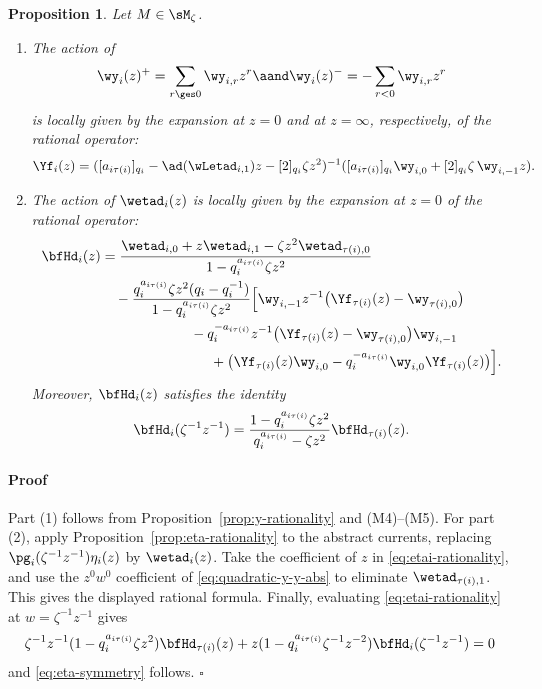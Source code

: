 \documentclass[reqno]{amsart}
\numberwithin{equation}{section}
\newtheorem*{proposition}{Proposition}
\newenvironment{pf}{\medskip\paragraph{{\sc Proof}}}{\hfill$\square$\par\medskip}
\begin{document}
\begin{proposition}
Let $M\in\sM_\zeta$.
\begin{enumerate}[leftmargin=2em]\itemsep0.25cm
\item The action of
\begin{equation}
	\wy_i(z)^+=\sum_{r\ges0}\wy_{i,r}z^r \aand \wy_i(z)^-=-\sum_{r<0}\wy_{i,r}z^r
\end{equation}
is locally given by the expansion at $z=0$ and at $z=\infty$, respectively, of the rational operator:
\begin{equation}
	\Yf_i(z)=([a_{i\tau(i)}]_{q_i}-\ad(\wLetad_{i,1})z-[2]_{q_i}\zeta z^2)^{-1}([a_{i\tau(i)}]_{q_i}\wy_{i,0}
	+[2]_{q_i}\zeta\, \wy_{i,-1}z).
\end{equation}
\item
The action of $\wetad_i(z)$ is locally given by the expansion at $z=0$ of the rational operator:
\begin{equation}
	\begin{aligned}
	\bfHd_i(z)
	&=
	\frac{\wetad_{i,0}+z\wetad_{i,1}-\zeta z^2\wetad_{\tau(i),0}}
	{1-q_i^{a_{i\tau(i)}}\zeta z^2}
	\\
	&\quad-
	\frac{q_i^{a_{i\tau(i)}}\zeta z^2(q_i-q_i^{-1})}
	{1-q_i^{a_{i\tau(i)}}\zeta z^2}
	\Big[
	\wy_{i,-1}
	z^{-1}\bigl(\Yf_{\tau(i)}(z)-\wy_{\tau(i),0}\bigr)
	\\
	&\hspace{2.25cm}
	-
	q_i^{-a_{i\tau(i)}}z^{-1}\bigl(\Yf_{\tau(i)}(z)-\wy_{\tau(i),0}\bigr)\wy_{i,-1}
	\\
	&\hspace{2.75cm}
	+
	\bigl(
	\Yf_{\tau(i)}(z)\wy_{i,0}
	-
	q_i^{-a_{i\tau(i)}}\wy_{i,0}\Yf_{\tau(i)}(z)
	\bigr)
	\Big].
\end{aligned}
\end{equation}
Moreover, $\bfHd_i(z)$ satisfies the identity
\begin{equation}\label{eq:eta-symmetry}
	\bfHd_i(\zeta^{-1}z^{-1})=\frac{1-q_i^{a_{i\tau(i)}}\zeta z^2}{q_i^{a_{i\tau(i)}}-\zeta z^2}\bfHd_{\tau(i)}(z).
\end{equation}
\end{enumerate}
\end{proposition}

\begin{pf}
Part (1) follows from Proposition~\ref{prop:y-rationality} and (M4)--(M5).
For part (2), apply Proposition~\ref{prop:eta-rationality} to the abstract
currents, replacing $\pg_i(\zeta^{-1}z^{-1})\eta_i(z)$ by $\wetad_i(z)$.
Take the coefficient of $z$ in \eqref{eq:etai-rationality}, and use the
$z^0w^0$ coefficient of \eqref{eq:quadratic-y-y-abs} to eliminate
$\wetad_{\tau(i),1}$. This gives the displayed rational formula.
Finally, evaluating \eqref{eq:etai-rationality} at
$w=\zeta^{-1}z^{-1}$ gives
\begin{align}
	\zeta^{-1}z^{-1}(1-q_i^{a_{i\tau(i)}}\zeta z^2)
	\bfHd_{\tau(i)}(z)
	+
	z(1-q_i^{a_{i\tau(i)}}\zeta^{-1}z^{-2})
	\bfHd_i(\zeta^{-1}z^{-1})=0
\end{align}
and \eqref{eq:eta-symmetry} follows.
\end{pf}
\end{document}
